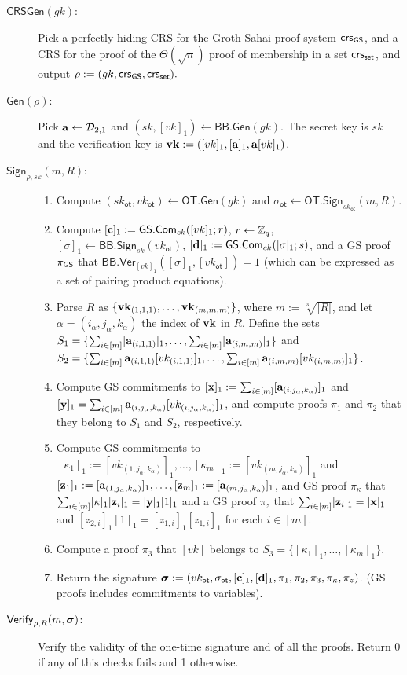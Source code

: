 \begin{description}
\item[$\mathsf{CRSGen}(gk)$:] Pick a perfectly hiding CRS for the Groth-Sahai proof system $\mathsf{crs}_{\mathsf{GS}}$, and a CRS for the proof of the $\Theta(\sqrt{n})$ proof of membership in a set $\mathsf{crs}_{\mathsf{set}}$, and output $\rho:=(gk,\mathsf{crs}_{\mathsf{GS}},\mathsf{crs}_{\mathsf{set}}).$
\item[$\mathsf{Gen}(\rho)$:] Pick $\mathbf{a}\gets\mathcal{D}_{2,1}$ and $(sk,[vk]_1)\gets\mathsf{BB}.\mathsf{Gen}(gk)$. The secret key is $sk$ and the verification key is $\mathbf{vk}:=([vk]_1,[\mathbf{a}]_1,\mathbf{a}[vk]_1)$.
\item[$\mathsf{Sign}_{\rho,sk}(m,R)$:]
\begin{enumerate}
\item Compute $(sk_\mathsf{ot},vk_\mathsf{ot})\gets\mathsf{OT}.\mathsf{Gen}(gk)$ and $\sigma_\mathsf{ot}\gets\mathsf{OT}.\mathsf{Sign}_{sk_\mathsf{ot}}(m,R)$.
\item Compute $[\mathbf{c}]_1:={\mathsf{GS}}.\mathsf{Com}_{ck}([vk]_1;r)$, $r\gets\mathbb{Z}_q$, $[\sigma]_1\gets\mathsf{BB}.\mathsf{Sign}_{sk}(vk_\mathsf{ot})$, $[\mathbf{d}]_1:={\mathsf{GS}}.\mathsf{Com}_{ck}([\sigma]_1;s)$, and a GS proof $\pi_{\mathsf{GS}}$ that $\mathsf{BB}.\mathsf{Ver}_{[vk]_1}([\sigma]_1,[vk_\mathsf{ot}])=1$ (which can be expressed as a set of pairing product equations).
\item Parse $R$ as $\{\mathbf{vk}_{(1,1,1)},\ldots,\mathbf{vk}_{(m,m,m)}\}$, where $m:=\sqrt[3]{|R|}$, and let $\alpha=(i_\alpha,j_\alpha,k_\alpha)$ the index of $\mathbf{vk}$ in $R$. Define the sets $S_1=\{\sum_{i\in[m]}[\mathbf{a}_{(i,1,1)}]_1,\allowbreak\ldots,\sum_{i\in[m]}[\mathbf{a}_{(i,m,m)}]_1\}$ and $S_2=\{\sum_{i\in[m]}\mathbf{a}_{(i,1,1)}[vk_{(i,1,1)}]_1,\allowbreak\ldots,\sum_{i\in[m]}\mathbf{a}_{(i,m,m)}[vk_{(i,m,m)}]_1\}$.
\item Compute GS commitments to $[\mathbf{x}]_1:=\sum_{i\in[m]}[\mathbf{a}_{(i,j_\alpha,k_\alpha)}]_1$ and $[\mathbf{y}]_1=\sum_{i\in[m]}\mathbf{a}_{(i,j_\alpha,k_\alpha)}[vk_{(i,j_\alpha,k_\alpha)}]_1$, and compute proofs $\pi_1$ and $\pi_2$ that they belong to $S_1$ and $S_2$, respectively.
\item Compute GS commitments to $[\kappa_1]_1:=[vk_{(1,j_\alpha,k_\alpha)}]_1,\ldots,[\kappa_m]_1:=[vk_{(m,j_\alpha,k_\alpha)}]_1$ and $[\mathbf{z}_1]_1:=[\mathbf{a}_{(1,j_\alpha,k_\alpha)}]_1,\ldots,[\mathbf{z}_m]_1:=[\mathbf{a}_{(m,j_\alpha,k_\alpha)}]_1$, and GS proof $\pi_\kappa$ that $\sum_{i\in[m]}[\kappa]_1[\mathbf{z}_i]_1=[\mathbf{y}]_1[1]_1$ and a GS proof $\pi_{z}$ that $\sum_{i\in[m]}[\mathbf{z}_i]_1=[\mathbf{x}]_1$ and $[z_{2,i}]_1[1]_1=[z_{1,i}]_1[z_{1,i}]_1$ for each $i\in[m]$.
\item Compute a proof $\pi_3$ that $[vk]$ belongs to $S_3=\{[\kappa_1]_1,\ldots,[\kappa_m]_1\}$.
\item Return the signature ${\boldsymbol \sigma}:=(vk_\mathsf{ot},\sigma_\mathsf{ot},[\mathbf{c}]_1,[\mathbf{d}]_1,\pi_1,\pi_2,\pi_3,\pi_\kappa,\pi_z)$. (GS proofs includes commitments to variables).
\end{enumerate}
\item[$\mathsf{Verify}_{\rho,R}(m,{\boldsymbol \sigma})$:] Verify the validity of the one-time signature and of all the proofs. Return 0 if any of this checks fails and 1 otherwise.
\end{description}

